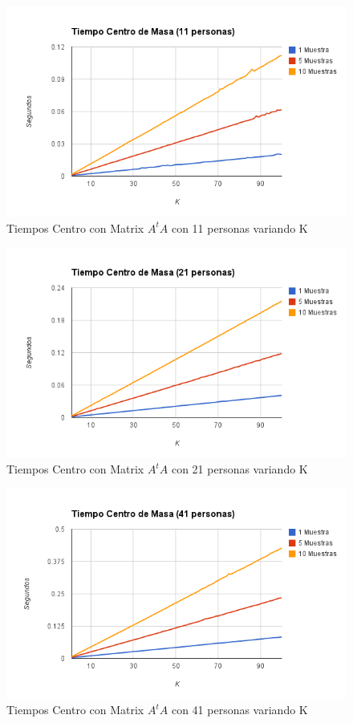 \begin{figure}[H] \includegraphics[width=1\textwidth]{img/image7.png} \caption{Tiempos Centro con
    Matrix $A^tA$ con 11 personas variando K} \end{figure}

\begin{figure}[H] \includegraphics[width=1\textwidth]{img/image8.png} \caption{Tiempos Centro con
    Matrix $A^tA$ con 21 personas variando K} \end{figure}

\begin{figure}[H] \includegraphics[width=1\textwidth]{img/image9.png} \caption{Tiempos Centro con
    Matrix $A^tA$ con 41 personas variando K} \end{figure}



